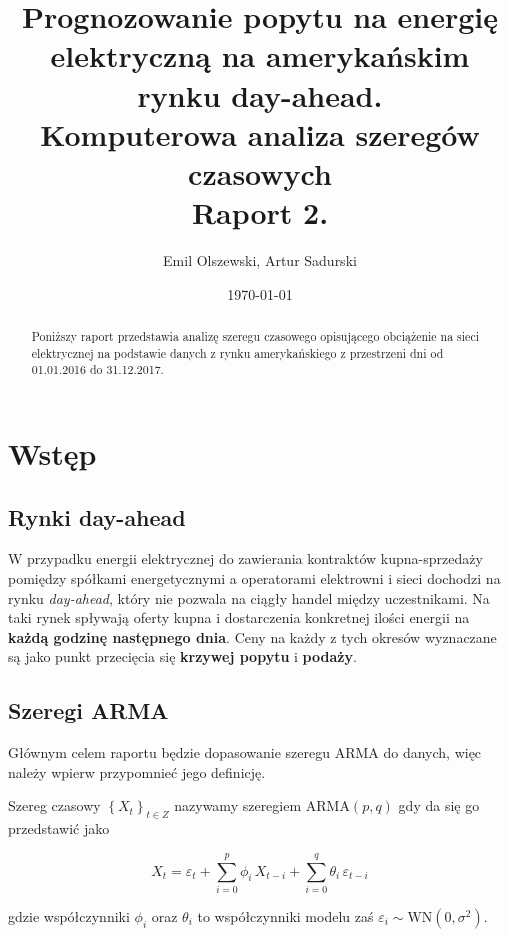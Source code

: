\documentclass{article}
\author{Emil Olszewski, Artur Sadurski}
\date{\today}
\title{Prognozowanie popytu na energię elektryczną na amerykańskim rynku day-ahead. \\  \large Komputerowa analiza szeregów czasowych \\ \large Raport 2. }
\begin{document}
\maketitle

\begin{abstract}
Poniższy raport przedstawia analizę szeregu czasowego opisującego obciążenie na sieci elektrycznej na podstawie danych z rynku amerykańskiego z przestrzeni dni od 01.01.2016 do 31.12.2017. 
\end{abstract}

\section{Wstęp}

\subsection{Rynki day-ahead} 

W przypadku energii elektrycznej do zawierania kontraktów kupna-sprzedaży pomiędzy spółkami energetycznymi a operatorami elektrowni i sieci dochodzi na rynku \textit{day-ahead}, który nie pozwala na ciągły handel między uczestnikami. Na taki rynek spływają oferty kupna i dostarczenia konkretnej ilości energii na \textbf{każdą godzinę następnego dnia}. Ceny na każdy z tych okresów wyznaczane są jako punkt przecięcia się \textbf{krzywej popytu} i \textbf{podaży}. 

\subsection{Szeregi ARMA}
Głównym celem raportu będzie dopasowanie szeregu ARMA do danych, więc należy wpierw przypomnieć jego definicję. 

\begin{definition}

Szereg czasowy ${\left\lbrace X_t \right\rbrace}_{t \in Z}$ nazywamy szeregiem $\text{ARMA}(p, q)$ gdy da się go przedstawić jako

$$ X_t = \varepsilon_t + \sum_{i=0}^p \phi_i\,X_{t-i} + \sum_{i=0}^q \theta_i\,\varepsilon_{t-i} $$

gdzie współczynniki $\phi_i$ oraz $\theta_i$ to współczynniki modelu zaś $\varepsilon_i \sim \text{WN}(0, \sigma^2)$. 

\end{definition}
\end{document}
